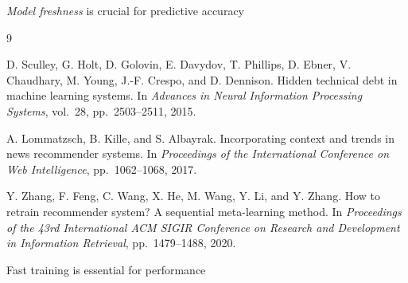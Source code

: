 \documentclass{beamer}
\begin{document}
\begin{frame}
    \centering
    \emph{Model freshness} is crucial for predictive accuracy
    \vspace{2em}
    {
        \scriptsize
        \begin{thebibliography}{9}
        
            D. Sculley, G. Holt, D. Golovin, E. Davydov, T. Phillips,
            D. Ebner, V. Chaudhary, M. Young, J.-F. Crespo, and D. Dennison.
            \newblock Hidden technical debt in machine learning systems.
            \newblock In \emph{Advances in Neural Information Processing Systems},
            vol.~28, pp.~2503--2511, 2015.
            
            A. Lommatzsch, B. Kille, and S. Albayrak.
            \newblock Incorporating context and trends in news recommender systems.
            \newblock In \emph{Proceedings of the International Conference on Web Intelligence},
            pp.~1062--1068, 2017.
            
            Y. Zhang, F. Feng, C. Wang, X. He, M. Wang, Y. Li, and Y. Zhang.
            \newblock How to retrain recommender system? A sequential meta-learning method.
            \newblock In \emph{Proceedings of the 43rd International ACM SIGIR Conference
            on Research and Development in Information Retrieval},
            pp.~1479--1488, 2020.
        \end{thebibliography}
    }
    \pause
    \vspace{2em}
    {\color{blue}Fast training} is essential for performance
\end{frame}
\end{document}
